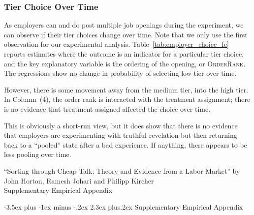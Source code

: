 \documentclass[12pt]{article}
\makeatletter
\renewcommand{\thesection}{\Roman{section}}
\renewcommand{\thesubsection}{\Roman{section}.\Alph{subsection}}
\renewcommand{\section}{%
  \@startsection{section}{1}{\z@}%
  {-3.5ex plus -1ex minus -.2ex}%
  {2.3ex plus.2ex}%
  {\normalfont\Large\bfseries}%
}
\makeatother
\begin{document}
\subsubsection{Tier Choice Over Time} 
\label{online_app:choice_over_time}

As employers can and do post multiple job openings during the experiment, we can observe if their tier choices change over time.
Note that we only use the first observation for our experimental analysis. 
Table~\ref{tab:employer_choice_fe} reports estimates where the outcome is an indicator for a particular tier choice, and the key explanatory variable is the ordering of the opening, or \textsc{OrderRank}.
The regressions show no change in probability of selecting low tier over time.

However, there is some movement away from the medium tier, into the high tier.
In Column~(4), the order rank is interacted with the treatment assignment; there is no evidence that treatment assigned affected the choice over time.

 

This is obviously a short-run view, but it does show that there is no evidence that employers are experimenting with truthful revelation but then returning back to a ``pooled'' state after a bad experience.
If anything, there appears to be less pooling over time. 






\clearpage

\appendix

\renewcommand{\thesection}{S\Alph{section}}
\renewcommand{\thesubsection}{S\Alph{section}.\arabic{subsection}}
\setcounter{section}{0} %
\setcounter{page}{1}

\begin{centering}
    \Large{``Sorting through Cheap Talk: Theory and Evidence from a Labor Market'' by John Horton, Ramesh Johari and Philipp Kircher \\ \bigskip 
    \LARGE Supplementary Empirical Appendix
    \\ \bigskip}
\end{centering}


\section{Supplementary Empirical Appendix}
\end{document}
